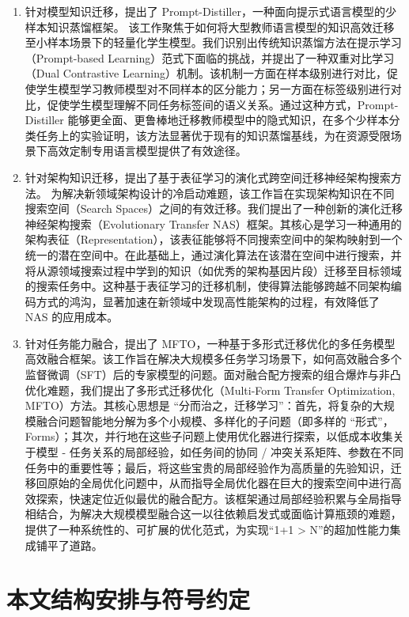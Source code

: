\documentclass[../main.tex]{subfiles}
\begin{document}
\begin{enumerate}
	\item 针对模型知识迁移，提出了 Prompt-Distiller，一种面向提示式语言模型的少样本知识蒸馏框架。 该工作聚焦于如何将大型教师语言模型的知识高效迁移至小样本场景下的轻量化学生模型。我们识别出传统知识蒸馏方法在提示学习（Prompt-based Learning）范式下面临的挑战，并提出了一种双重对比学习（Dual Contrastive Learning）机制。该机制一方面在样本级别进行对比，促使学生模型学习教师模型对不同样本的区分能力；另一方面在标签级别进行对比，促使学生模型理解不同任务标签间的语义关系。通过这种方式，Prompt-Distiller 能够更全面、更鲁棒地迁移教师模型中的隐式知识，在多个少样本分类任务上的实验证明，该方法显著优于现有的知识蒸馏基线，为在资源受限场景下高效定制专用语言模型提供了有效途径。
	\item 针对架构知识迁移，提出了基于表征学习的演化式跨空间迁移神经架构搜索方法。 为解决新领域架构设计的冷启动难题，该工作旨在实现架构知识在不同搜索空间（Search Spaces）之间的有效迁移。我们提出了一种创新的演化迁移神经架构搜索（Evolutionary Transfer NAS）框架。其核心是学习一种通用的架构表征（Representation），该表征能够将不同搜索空间中的架构映射到一个统一的潜在空间中。在此基础上，通过演化算法在该潜在空间中进行搜索，并将从源领域搜索过程中学到的知识（如优秀的架构基因片段）迁移至目标领域的搜索任务中。这种基于表征学习的迁移机制，使得算法能够跨越不同架构编码方式的鸿沟，显著加速在新领域中发现高性能架构的过程，有效降低了 NAS 的应用成本。
	\item 针对任务能力融合，提出了 MFTO，一种基于多形式迁移优化的多任务模型高效融合框架。该工作旨在解决大规模多任务学习场景下，如何高效融合多个监督微调（SFT）后的专家模型的问题。面对融合配方搜索的组合爆炸与非凸优化难题，我们提出了多形式迁移优化（Multi-Form Transfer Optimization, MFTO）方法。其核心思想是 “分而治之，迁移学习”：首先，将复杂的大规模融合问题智能地分解为多个小规模、多样化的子问题（即多样的 “形式”，Forms）；其次，并行地在这些子问题上使用优化器进行探索，以低成本收集关于模型 - 任务关系的局部经验，如任务间的协同 / 冲突关系矩阵、参数在不同任务中的重要性等；最后，将这些宝贵的局部经验作为高质量的先验知识，迁移回原始的全局优化问题中，从而指导全局优化器在巨大的搜索空间中进行高效探索，快速定位近似最优的融合配方。该框架通过局部经验积累与全局指导相结合，为解决大规模模型融合这一以往依赖启发式或面临计算瓶颈的难题，提供了一种系统性的、可扩展的优化范式，为实现“1+1 > N”的超加性能力集成铺平了道路。
\end{enumerate}

\section[\hspace{-2pt}本文结构安排与符号约定]{{\heiti{} \hspace{-8pt}本文结构安排与符号约定}}\label{sec:structure-and-symbols}
\end{document}
